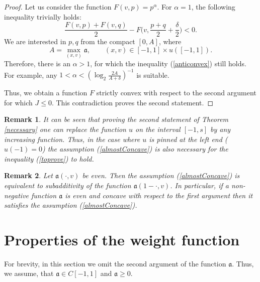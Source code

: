 \documentclass[12pt]{article}
\renewcommand{\ge}{\geqslant}
\renewcommand{\le}{\leqslant}
\newtheorem{rem}{Remark}
\begin{document}
\begin{proof}
Let us consider the function $F(v, p) = p ^ \alpha$.
For $\alpha = 1$, the following inequality trivially holds:
\begin{equation}
\label{anticonvex}
\frac{F(v, p) + F(v, q)}{ 2 } - F\big(v, \frac{p + q}{ 2 } + \frac{\delta}{ 2 }\big) <0.
\end{equation}
We are interested in $p, q$ from the compact $[0 , A]$,
where 
\begin{equation}
\label{weightMax}
A=\max \limits_{(x, v)} \mathfrak a,\qquad (x, v) \in [-1, 1 ] \times u([-1, 1] ).
\end{equation}
Therefore, there is an $\alpha> 1$, for which the inequality (\ref{anticonvex})
still holds.
For example, any $1 < \alpha < (\log_2 \frac{ 2 A}{A + \delta})^{-1}$ is suitable.

Thus, we obtain a function $F$ strictly convex with respect to the second argument
for which $J \le 0$. This contradiction proves the second statement.
\end{proof}

\begin{rem}
\label{landesNecessary}
It can be seen that proving the second statement of Theorem \ref{necessary}
one can replace the function $u$ on the interval $[-1, s]$ by any increasing function.
Thus, in the case where $u$ is pinned at the left end {\rm ($u(-1) = 0$)}
the assumption (\ref{almostConcave}) is also necessary for the inequality (\ref{toprove}) to hold.
\end{rem}

\begin{rem}
Let $\mathfrak a(\cdot, v)$ be even.
Then the assumption (\ref{almostConcave}) is equivalent to subadditivity of the function $\mathfrak a(1 - \cdot, v)$.
In particular, if a non-negative function $\mathfrak a$ is even and concave with respect to the first argument then it satisfies the assumption (\ref{almostConcave}).
\end{rem}

\section{Properties of the weight function}

For brevity, in this section we omit the second argument of the function $\mathfrak a$.
Thus, we assume, that $\mathfrak a \in C[-1, 1]$ and $\mathfrak a \ge 0$.
\end{document}
